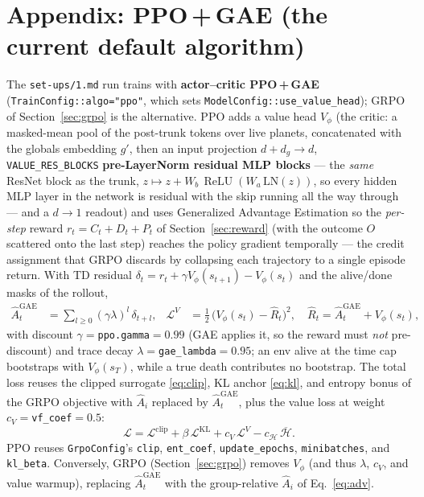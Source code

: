 \documentclass[11pt]{article}
\newcommand{\relu}{\operatorname{ReLU}}
\newcommand{\Adv}{\hat{A}}
\begin{document}
\appendix
\section{Appendix: PPO\,+\,GAE (the current default algorithm)}\label{sec:ppo}
The \texttt{set-ups/1.md} run trains with \textbf{actor--critic PPO\,+\,GAE}
(\texttt{TrainConfig::algo="ppo"}, which sets \texttt{ModelConfig::use\_value\_head}); GRPO of
Section~\ref{sec:grpo} is the alternative. PPO adds a value head $V_\phi$ (the critic: a masked-mean pool
of the post-trunk tokens over live planets, concatenated with the globals embedding $g'$, then an input
projection $d{+}d_g\to d$, \texttt{VALUE\_RES\_BLOCKS} \textbf{pre-LayerNorm residual MLP blocks} --- the
\emph{same} ResNet block as the trunk, $z\mapsto z+W_b\,\relu(W_a\,\mathrm{LN}(z))$, so every hidden MLP
layer in the network is residual with the skip running all the way through --- and a $d\to 1$ readout) and
uses Generalized Advantage Estimation so the \emph{per-step} reward
$r_t=C_t+D_t+P_t$ of Section~\ref{sec:reward} (with the outcome $O$ scattered onto the last step) reaches
the policy gradient temporally --- the credit assignment that GRPO discards by collapsing each
trajectory to a single episode return. With TD residual
$\delta_t = r_t + \gamma V_\phi(s_{t+1}) - V_\phi(s_t)$ and the alive/done masks of the rollout,
\begin{align}
\Adv^{\mathrm{GAE}}_t &= \sum_{l\geq 0}(\gamma\lambda)^{l}\,\delta_{t+l},
&
\mathcal{L}^{V} &= \tfrac12\,\big(V_\phi(s_t) - \hat R_t\big)^2,
\quad \hat R_t = \Adv^{\mathrm{GAE}}_t + V_\phi(s_t),
\end{align}
with discount $\gamma=$\texttt{ppo.gamma}$=0.99$ (GAE applies it, so the reward must \emph{not}
pre-discount) and trace decay $\lambda=$\texttt{gae\_lambda}$=0.95$; an env alive at the time cap
bootstraps with $V_\phi(s_T)$, while a true death contributes no bootstrap. The total loss reuses the
clipped surrogate \eqref{eq:clip}, KL anchor \eqref{eq:kl}, and entropy bonus of the GRPO objective with
$\Adv_i$ replaced by $\Adv^{\mathrm{GAE}}_t$, plus the value loss at weight
$c_V=$\texttt{vf\_coef}$=0.5$:
\[
\mathcal{L} = \mathcal{L}^{\mathrm{clip}} + \beta\,\mathcal{L}^{\mathrm{KL}}
            + c_V\,\mathcal{L}^{V} - c_{\mathcal H}\,\overline{\mathcal H}.
\]
PPO reuses \texttt{GrpoConfig}'s \texttt{clip}, \texttt{ent\_coef}, \texttt{update\_epochs},
\texttt{minibatches}, and \texttt{kl\_beta}. Conversely, GRPO (Section~\ref{sec:grpo}) removes $V_\phi$
(and thus $\lambda$, $c_V$, and value warmup), replacing $\Adv^{\mathrm{GAE}}_t$ with the
group-relative $\Adv_i$ of Eq.~\eqref{eq:adv}.
\end{document}
